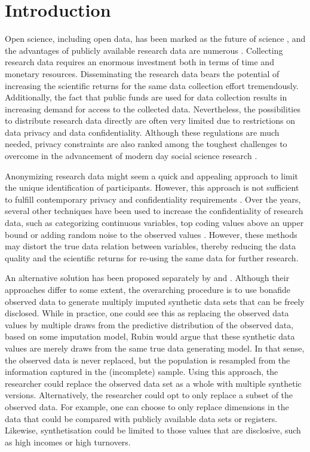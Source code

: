 \documentclass[psych,article,submit,moreauthors,pdftex]{mdpi}
\begin{document}

\hypertarget{introduction}{%
\section{Introduction}\label{introduction}}

Open science, including open data, has been marked as the future of
science \citep{gewin_data_2016}, and the advantages of publicly
available research data are numerous
\citep{molloy_open_2011, walport_brest_sharing_2011}. Collecting
research data requires an enormous investment both in terms of time and
monetary resources. Disseminating the research data bears the potential
of increasing the scientific returns for the same data collection effort
tremendously. Additionally, the fact that public funds are used for data
collection results in increasing demand for access to the collected
data. Nevertheless, the possibilities to distribute research data
directly are often very limited due to restrictions on data privacy and
data confidentiality. Although these regulations are much needed,
privacy constraints are also ranked among the toughest challenges to
overcome in the advancement of modern day social science research
\citep{lazer_life_2009}.

Anonymizing research data might seem a quick and appealing approach to
limit the unique identification of participants. However, this approach
is not sufficient to fulfill contemporary privacy and confidentiality
requirements \citep{ohm_broken_2009, national_putting_2007}. Over the
years, several other techniques have been used to increase the
confidentiality of research data, such as categorizing continuous
variables, top coding values above an upper bound or adding random noise
to the observed values \citep{drechsler_synthetic_2011}. However, these
methods may distort the true data relation between variables, thereby
reducing the data quality and the scientific returns for re-using the
same data for further research.

An alternative solution has been proposed separately by
\citet{rubin_statistical_disclosure_1993} and
\citet{little_statistical_1993}. Although their approaches differ to
some extent, the overarching procedure is to use bonafide observed data
to generate multiply imputed synthetic data sets that can be freely
disclosed. While in practice, one could see this as replacing the
observed data values by multiple draws from the predictive distribution
of the observed data, based on some imputation model, Rubin would argue
that these synthetic data values are merely draws from the same true
data generating model. In that sense, the observed data is never
replaced, but the population is resampled from the information captured
in the (incomplete) sample. Using this approach, the researcher could
replace the observed data set as a whole with multiple synthetic
versions. Alternatively, the researcher could opt to only replace a
subset of the observed data. For example, one can choose to only replace
dimensions in the data that could be compared with publicly available
data sets or registers. Likewise, synthetisation could be limited to
those values that are disclosive, such as high incomes or high
turnovers.
\end{document}
